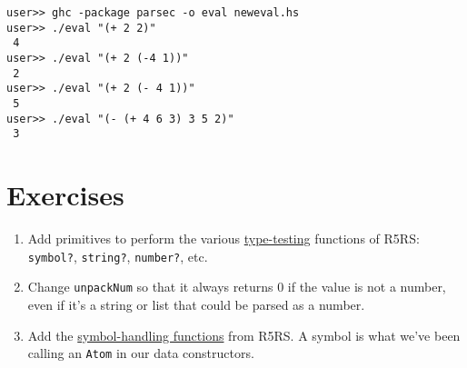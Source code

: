 \begin{lstlisting}[language=shell,numbers=none,nolol]
user>> ghc -package parsec -o eval neweval.hs
user>> ./eval "(+ 2 2)"
 4
user>> ./eval "(+ 2 (-4 1))"
 2
user>> ./eval "(+ 2 (- 4 1))"
 5
user>> ./eval "(- (+ 4 6 3) 3 5 2)"
 3
\end{lstlisting}
 
\section{Exercises}
 
\begin{enumerate}
	\item Add primitives to perform the various \href{http://www.schemers.org/Documents/Standards/R5RS/HTML/r5rs-Z-H-9.html\#\%_sec_6.3}{type-testing} functions of R5RS: \verb|symbol?|, \verb|string?|, \verb|number?|, etc.
	\item Change \verb|unpackNum| so that it always returns 0 if the value is not a number, even if it's a string or list that could be parsed as a number.
	\item Add the \href{http://www.schemers.org/Documents/Standards/R5RS/HTML/r5rs-Z-H-9.html\#\%_sec_6.3.3}{symbol-handling functions} from R5RS. A symbol is what we've been calling an \verb|Atom| in our data constructors.
\end{enumerate}
